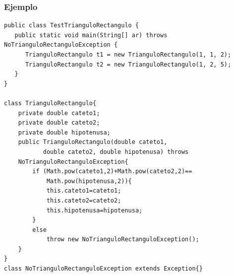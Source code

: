 \documentclass{beamer}
\begin{document}
\begin{frame}[fragile]
\frametitle{Ejemplo}
\begin{scriptsize}

\begin{verbatim}
public class TestTrianguloRectangulo {
   public static void main(String[] ar) throws NoTrianguloRectanguloException {
      TrianguloRectangulo t1 = new TrianguloRectangulo(1, 1, 2);
      TrianguloRectangulo t2 = new TrianguloRectangulo(1, 2, 5);
   }
}

class TrianguloRectangulo{
    private double cateto1;
    private double cateto2;
    private double hipotenusa;
    public TrianguloRectangulo(double cateto1,
           double cateto2, double hipotenusa) throws
    NoTrianguloRectanguloException{
        if (Math.pow(cateto1,2)+Math.pow(cateto2,2)==
            Math.pow(hipotenusa,2)){
            this.cateto1=cateto1;
            this.cateto2=cateto2;
            this.hipotenusa=hipotenusa;
        }
        else
            throw new NoTrianguloRectanguloException();
    }
}
class NoTrianguloRectanguloException extends Exception{}
\end{verbatim}

\end{scriptsize}
\end{frame}
\end{document}
